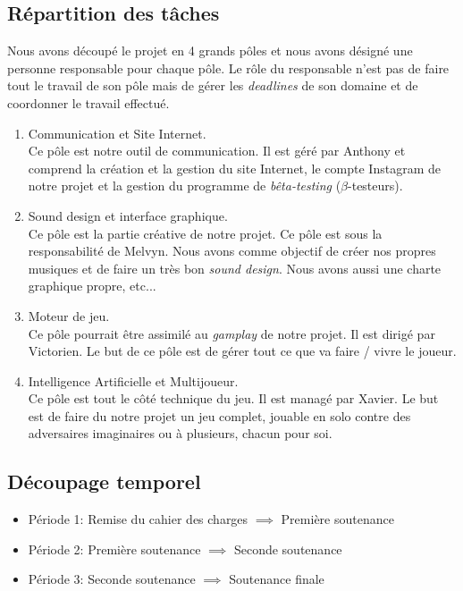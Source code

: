 \documentclass[11pt,a4paper]{article}
\begin{document}
  \subsection{Répartition des tâches} 
    Nous avons découpé le projet en 4 grands pôles et nous avons désigné une personne responsable
    pour chaque pôle. Le rôle du responsable n'est pas de faire tout le travail de son pôle mais
    de gérer les \textit{deadlines} de son domaine et de coordonner le travail effectué.
    \begin{enumerate}
      \item Communication et Site Internet.\\
        Ce pôle est notre outil de communication. Il est géré par Anthony et comprend la création
        et la gestion du site Internet, le compte Instagram de notre projet \cite{insta} et la
        gestion du programme de \textit{bêta-testing} (\(\beta\)-testeurs).
      \item Sound design et interface graphique.\\
        Ce pôle est la partie créative de notre projet. Ce pôle est sous la responsabilité de Melvyn.
        Nous avons comme objectif de créer nos propres musiques et de faire un très bon \textit{sound design}.
        Nous avons aussi une charte graphique propre, etc...
      \item Moteur de jeu.\\
        Ce pôle pourrait être assimilé au \textit{gamplay} de notre projet. Il est dirigé par Victorien.
        Le but de ce pôle est de gérer tout ce que va faire / vivre le joueur. 
      \item Intelligence Artificielle et Multijoueur.\\
        Ce pôle est tout le côté technique du jeu. Il est managé par Xavier. Le but est de faire du notre projet
        un jeu complet, jouable en solo contre des adversaires imaginaires ou à plusieurs, chacun pour soi.
    \end{enumerate}
  \subsection{Découpage temporel}
    \begin{itemize}
      \item Période 1: Remise du cahier des charges \(\implies\) Première soutenance
      \item Période 2: Première soutenance \(\implies\) Seconde soutenance
      \item Période 3: Seconde soutenance \(\implies\) Soutenance finale
    \end{itemize}
\clearpage
\end{document}
